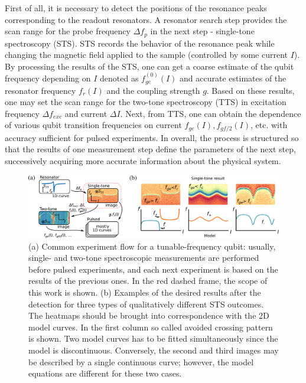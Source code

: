 \documentclass[%
 aip,
 draft,
 amsmath,amssymb,
 reprint,%
]{revtex4-1}
\begin{document}
First of all, it is necessary to detect the positions of the resonance peaks corresponding to the readout resonators. A resonator search step provides the scan range for the probe frequency $\Delta f_p$ in the next step - single-tone spectroscopy (STS). STS records the behavior of the resonance peak while changing the magnetic field applied to the sample (controlled by some current $I$). By processing the results of the STS, one can get a coarse estimate of the qubit frequency depending on $I$  denoted as  $f^{(0)}_{ge}(I)$ and accurate estimates of the resonator frequency $f_r(I)$ and the coupling strength $g$. Based on these results, one may set the scan range for the two-tone spectroscopy (TTS) in excitation frequency $\Delta f_{exc}$ and current $\Delta I$. Next, from TTS, one can obtain the dependence of various qubit transition frequencies on current $f_{ge}(I), f_{gf/2}(I)$, etc. with accuracy sufficient for pulsed experiments. In overall, the process is structured so that the results of one measurement step define the parameters of the next step, successively acquiring more accurate information about the physical system.

\begin{figure}
	\centering
	\includegraphics[width=0.95\linewidth]{detection_sts}
	\caption{(a) Common experiment flow for a tunable-frequency qubit: usually, single- and two-tone spectroscopic measurements are performed before pulsed experiments, and each next experiment is based on the results of the previous ones. In the red dashed frame, the scope of this work is shown. (b) Examples of the desired results after the detection for three types of qualitatively different STS outcomes. The heatmaps should be brought into correspondence with the 2D model curves. In the first column so called avoided crossing pattern is shown. Two model curves has to be fitted simultaneously since the model is discontinuous. Conversely, the second and third images may be described by a single continuous curve; however, the model equations are different for these two cases.}
	\label{fig:detection}	
\end{figure} 
\end{document}
